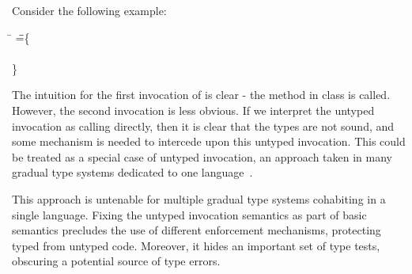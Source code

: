 \documentclass[USenglish]{tex/lipics-v2016}
\begin{document}
Consider the following example:

\begin{tabbing}
\hspace{1cm}\K\HS\=
 \HS\HS\HS\HS\HS\HS\HS\HS\HS\HS\WHERE
  \K\HS =\HS \= \class\= \C \{\\
\>        \> \HS {}\\
   \>    \> \}
\end{tabbing}

The intuition for the first invocation of \m is clear - the method \m in
class \C is called.  However, the second invocation is less obvious. If we
interpret the untyped invocation as calling \m directly, then it is clear
that the types are not sound, and some mechanism is needed to intercede upon
this untyped invocation.  This could be treated as a special case of untyped
invocation, an approach taken in many gradual type systems dedicated to one
language~\cite{popl10,ecoop15,Muehlboeck2017}.

This approach is untenable for multiple gradual type systems cohabiting in a
single language. Fixing the untyped invocation semantics as part of basic
semantics precludes  the use of different enforcement mechanisms, protecting
typed from untyped code. Moreover, it hides an important set of type tests, 
obscuring a potential source of type errors.
\end{document}
